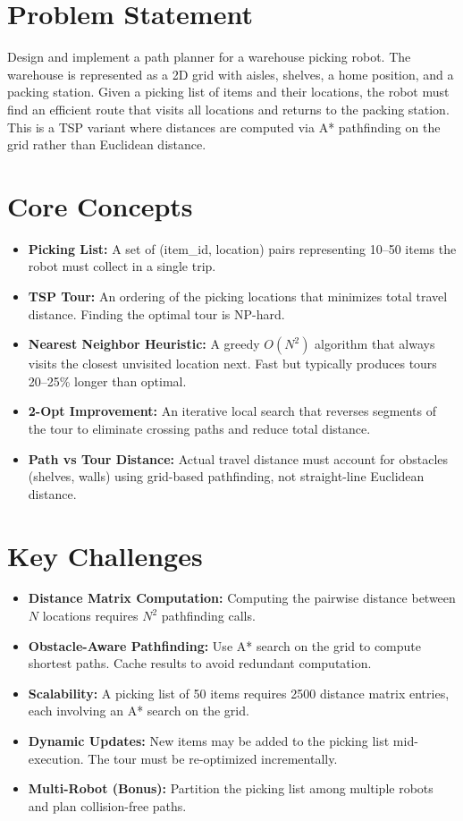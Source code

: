 \section{Problem Statement}

Design and implement a path planner for a warehouse picking robot. The warehouse is represented as a 2D grid with aisles, shelves, a home position, and a packing station. Given a picking list of items and their locations, the robot must find an efficient route that visits all locations and returns to the packing station. This is a TSP variant where distances are computed via A* pathfinding on the grid rather than Euclidean distance.

\section{Core Concepts}

\begin{itemize}
  \item \textbf{Picking List:} A set of (item\_id, location) pairs representing 10--50 items the robot must collect in a single trip.
  \item \textbf{TSP Tour:} An ordering of the picking locations that minimizes total travel distance. Finding the optimal tour is NP-hard.
  \item \textbf{Nearest Neighbor Heuristic:} A greedy $O(N^2)$ algorithm that always visits the closest unvisited location next. Fast but typically produces tours 20--25\% longer than optimal.
  \item \textbf{2-Opt Improvement:} An iterative local search that reverses segments of the tour to eliminate crossing paths and reduce total distance.
  \item \textbf{Path vs Tour Distance:} Actual travel distance must account for obstacles (shelves, walls) using grid-based pathfinding, not straight-line Euclidean distance.
\end{itemize}

\section{Key Challenges}

\begin{itemize}
  \item \textbf{Distance Matrix Computation:} Computing the pairwise distance between $N$ locations requires $N^2$ pathfinding calls.
  \item \textbf{Obstacle-Aware Pathfinding:} Use A* search on the grid to compute shortest paths. Cache results to avoid redundant computation.
  \item \textbf{Scalability:} A picking list of 50 items requires 2500 distance matrix entries, each involving an A* search on the grid.
  \item \textbf{Dynamic Updates:} New items may be added to the picking list mid-execution. The tour must be re-optimized incrementally.
  \item \textbf{Multi-Robot (Bonus):} Partition the picking list among multiple robots and plan collision-free paths.
\end{itemize}


